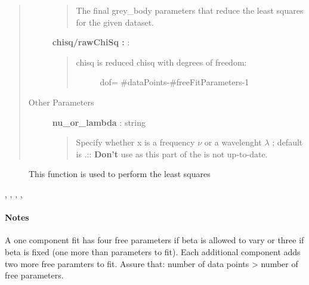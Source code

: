 \documentclass[a4paper,10pt,english]{sphinxmanual}
\begin{document}
\begin{fulllineitems}
\begin{quote}
\begin{description}
\begin{quote}
The final grey\_body parameters that reduce the least squares for the
given dataset.
\end{quote}

\textbf{chisq/rawChiSq :} :
\begin{quote}
\begin{description}
\item[{chisq is reduced chisq with degrees of freedom:}] \leavevmode
dof= \#dataPoints-\#freeFitParameters-1

\end{description}
\end{quote}

\item[{Other Parameters}] \leavevmode
\textbf{nu\_or\_lambda} : string
\begin{quote}

Specify whether x is a frequency $\nu$  or
a wavelenght $\lambda$ ; default is .::
\textbf{Don't} use  as this part of the
{\hyperref[functions:astrolyze.functions.astro_functions.grey_body]{}} is not up-to-date.
\end{quote}

\end{description}\end{quote}



\begin{description}
\item[{}] \leavevmode
This function is used to perform the least squares

\end{description}

, {\hyperref[functions:astrolyze.functions.astro_functions.multi_component_grey_body]{}}, {\hyperref[functions:astrolyze.functions.astro_functions.grey_body]{}}, {\hyperref[functions:astrolyze.functions.astro_functions.black_body]{}}, 


\paragraph{Notes}

A one component fit has four free parameters if beta is allowed to vary or
three if beta is fixed (one more than parameters to fit). Each additional
component adds two more free paramters to fit.
Assure that:
number of data points \textgreater{} number of free parameters.

\end{fulllineitems}
\end{document}

